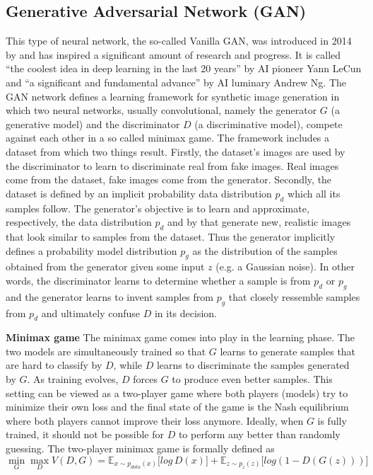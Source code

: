 \documentclass[12pt,a4paper]{article}
\begin{document}
\subsection{Generative Adversarial Network (GAN)}
This type of neural network, the so-called Vanilla GAN, was introduced in 2014 by \cite{1406.2661} and has inspired a significant amount of research and progress. It is called ``the coolest idea in deep learning in the last 20 years'' by AI pioneer Yann LeCun and ``a significant and fundamental advance'' by AI luminary Andrew Ng. The GAN network defines a learning framework for synthetic image generation in which two neural networks, usually convolutional, namely the generator $G$ (a generative model) and the discriminator $D$ (a discriminative model), compete against each other in a so called minimax game. The framework includes a dataset from which two things result. Firstly, the dataset's images are used by the discriminator to learn to discriminate real from fake images. Real images come from the dataset, fake images come from the generator. Secondly, the dataset is defined by an implicit probability data distribution $p_d$ which all its samples follow. The generator's objective is to learn and approximate, respectively, the data distribution $p_d$ and by that generate new, realistic images that look similar to samples from the dataset. Thus the generator implicitly defines a probability model distribution $p_g$ as the distribution of the samples obtained from the generator given some input $z$ (e.g. a Gaussian noise). In other words, the discriminator learns to determine whether a sample is from $p_d$ or $p_g$ and the generator learns to invent samples from $p_g$ that closely ressemble samples from $p_d$ and ultimately confuse $D$ in its decision.
\par \textbf{Minimax game} The minimax game comes into play in the learning phase. The two models are simultaneously trained so that $G$ learns to generate samples that are hard to classify by $D$, while $D$ learns to discriminate the samples generated by $G$. As training evolves, $D$ forces $G$ to produce even better samples. This setting can be viewed as a two-player game where both players (models) try to minimize their own loss and the final state of the game is the Nash equilibrium where both players cannot improve their loss anymore. Ideally, when $G$ is fully trained, it should not be possible for $D$ to perform any better than randomly guessing. The two-player minimax game is formally defined as
\begin{equation} \label{eq:1}
\min\limits_{G} \max\limits_{D} V(D,G) = \mathbb{E}_{x\sim p_{data} (x)}\big[log\, D(x)\big] + \mathbb{E}_{z\sim p_{z} (z)}\big[log(1 - D(G(z)))\big]
\end{equation}
\end{document}
